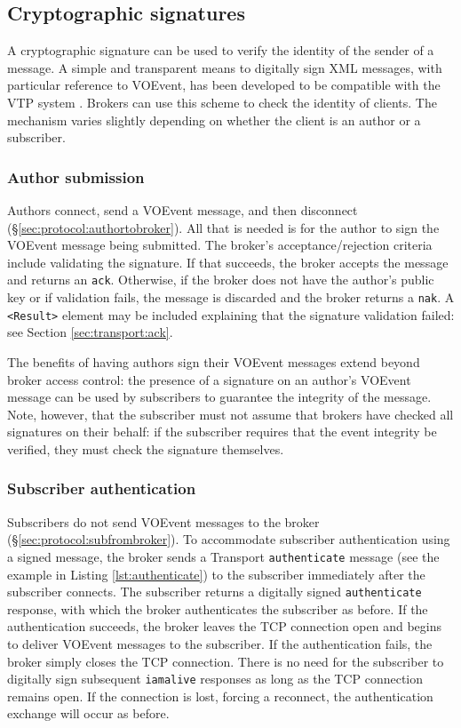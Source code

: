 \documentclass[a4paper,11pt]{ivoa}
\begin{document}
\subsection{Cryptographic signatures}
\label{sec:limit:crypto}

A cryptographic signature can be used to verify the identity of the sender of
a message. A simple and transparent means to digitally sign XML messages, with
particular reference to VOEvent, has been developed to be compatible with the
VTP system \citep{Denny:2008}. Brokers can use this scheme to check the
identity of clients. The mechanism varies slightly depending on whether the
client is an author or a subscriber.

\subsubsection{Author submission}
\label{sec:limit:crypto:author}

Authors connect, send a VOEvent message, and then disconnect
(\S\ref{sec:protocol:authortobroker}).  All that is needed is for the author
to sign the VOEvent message being submitted. The broker's acceptance/rejection
criteria include validating the signature. If that succeeds, the broker
accepts the message and returns an \texttt{ack}. Otherwise, if the broker does
not have the author's public key or if validation fails, the message is
discarded and the broker returns a \texttt{nak}. A \texttt{<Result>} element
may be included explaining that the signature validation failed: see Section
\ref{sec:transport:ack}.

The benefits of having authors sign their VOEvent messages extend beyond
broker access control: the presence of a signature on an author's VOEvent
message can be used by subscribers to guarantee the integrity of the message.
Note, however, that the subscriber must not assume that brokers have checked
all signatures on their behalf: if the subscriber requires that the event
integrity be verified, they must check the signature themselves.

\subsubsection{Subscriber authentication}
\label{sec:limit:crypto:subscriber}

Subscribers do not send VOEvent messages to the broker
(\S\ref{sec:protocol:subfrombroker}). To accommodate subscriber authentication
using a signed message, the broker sends a Transport \texttt{authenticate}
message (see the example in Listing \ref{lst:authenticate}) to the subscriber
immediately after the subscriber connects. The subscriber returns a digitally
signed \texttt{authenticate} response, with which the broker authenticates the
subscriber as before. If the authentication succeeds, the broker leaves the
TCP connection open and begins to deliver VOEvent messages to the subscriber.
If the authentication fails, the broker simply closes the TCP connection.
There is no need for the subscriber to digitally sign subsequent
\texttt{iamalive} responses as long as the TCP connection remains open. If the
connection is lost, forcing a reconnect, the authentication exchange will
occur as before.
\end{document}
